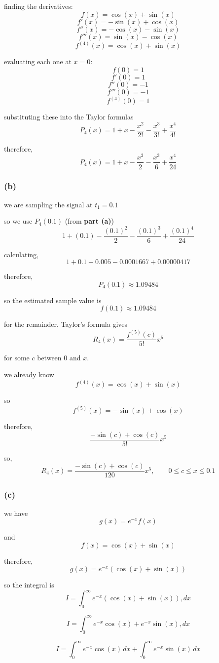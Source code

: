 \documentclass{article}
\begin{document}
finding the derivatives:
$$f(x)=\cos(x)+\sin(x)$$
$$f'(x)=-\sin(x)+\cos(x)$$
$$f''(x)=-\cos(x)-\sin(x)$$
$$f'''(x)=\sin(x)-\cos(x)$$
$$f^{(4)}(x)=\cos(x)+\sin(x)$$

evaluating each one at $x=0$:
$$f(0)=1$$
$$f'(0)=1$$
$$f''(0)=-1$$
$$f'''(0)=-1$$
$$f^{(4)}(0)=1$$

substituting these into the Taylor formulas
\[
P_4(x) = 1+x-\frac{x^2}{2!}-\frac{x^3}{3!}+\frac{x^4}{4!}
\]

therefore,
\[
\boxed{P_4(x) = 1+x-\frac{x^2}{2}-\frac{x^3}{6}+\frac{x^4}{24}}
\]

\subsubsection*{(b)}
we are sampling the signal at $t_1=0.1$

so we use $P_4(0.1)$ (from \textbf{part (a)})
\[
1+(0.1)-\frac{(0.1)^2}{2} - \frac{(0.1)^3}{6} + \frac{(0.1)^4}{24}
\]

calculating,
\[
1+0.1-0.005-0.0001667+0.00000417
\]

therefore,
\[
\boxed{P_4(0.1)\approx1.09484}
\]

so the estimated sample value is
\[
\boxed{f(0.1)\approx1.09484}
\]

for the remainder, Taylor's formula gives
\[
R_4(x)=\frac{f^{(5)}(c)}{5!}x^5
\]

for some $c$ between $0$ and $x$.

we already know
\[
f^{(4)}(x)=\cos(x)+\sin(x)
\]

so
\[
f^{(5)}(x)=-\sin(x)+\cos(x)
\]

therefore,
\[
\frac{-\sin(c)+\cos(c)}{5!}x^5
\]

so,
\[
\boxed{
R_4(x)=\frac{-\sin(c)+\cos(c)}{120}x^5, \qquad 0\leq c\leq x\leq0.1
}
\]

\subsubsection*{(c)}
we have
\[
g(x)=e^{-x}f(x)
\]

and
\[
f(x)=\cos(x)+\sin(x)
\]

therefore,
\[
g(x)=e^{-x}(\cos(x)+\sin(x))
\]

so the integral is
\[
I=\int_0^\infty e^{-x}(\cos(x)+\sin(x)),dx
\]

\[
I=\int_0^\infty e^{-x}\cos(x)+e^{-x}\sin(x),dx
\]

\[
I = \int_0^\infty e^{-x}\cos(x)\,dx + \int_0^\infty e^{-x}\sin(x)\,dx
\]
\end{document}
